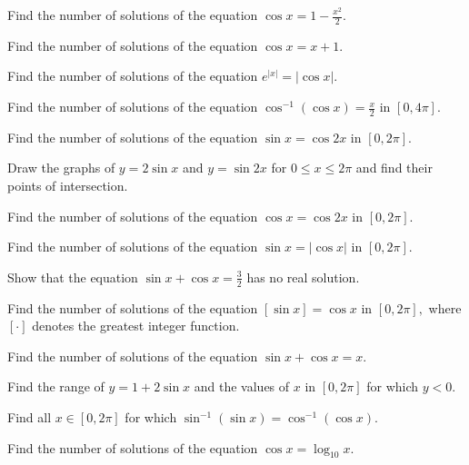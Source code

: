 \item Find the number of solutions of the equation $\cos x = 1 - \frac{x^2}{2}.$

\item Find the number of solutions of the equation $\cos x = x + 1.$

\item Find the number of solutions of the equation $e^{|x|} = |\cos x|.$

\item Find the number of solutions of the equation $\cos^{-1}(\cos x) = \frac{x}{2}$ in $[0, 4\pi].$

\item Find the number of solutions of the equation $\sin x = \cos2x$ in $[0, 2\pi].$

\item Draw the graphs of $y = 2\sin x$ and $y = \sin2x$ for $0\leq x\leq 2\pi$ and find their points of intersection.

\item Find the number of solutions of the equation $\cos x = \cos2x$ in $[0, 2\pi].$

\item Find the number of solutions of the equation $\sin x = |\cos x|$ in $[0, 2\pi].$

\item Show that the equation $\sin x + \cos x = \frac{3}{2}$ has no real solution.

\item Find the number of solutions of the equation $[\sin x] = \cos x$ in $[0, 2\pi],$ where $[\cdot]$ denotes the
    greatest integer function.

\item Find the number of solutions of the equation $\sin x + \cos x = x.$

\item Find the range of $y = 1 + 2\sin x$ and the values of $x$ in $[0, 2\pi]$ for which $y < 0.$

\item Find all $x\in[0, 2\pi]$ for which $\sin^{-1}(\sin x) = \cos^{-1}(\cos x).$

\item Find the number of solutions of the equation $\cos x = \log_{10}x.$

\stopitemize
